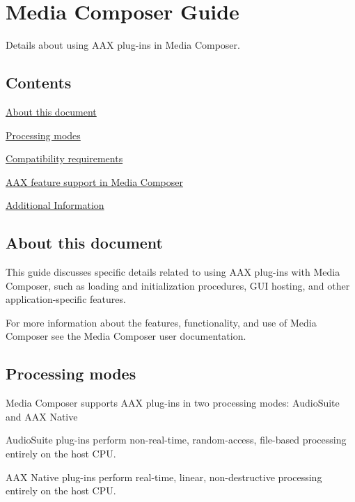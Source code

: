 \hypertarget{a00361}{}\section{Media Composer Guide}
\label{a00361}
Details about using A\+A\+X plug-\/ins in Media Composer. 

\hypertarget{a00361_aax_media_composer_guide_contents}{}\subsection{Contents}\label{a00361_aax_media_composer_guide_contents}
\begin{DoxyItemize}
\item \hyperlink{a00361_aax_media_composer_guide__about_this_document}{About this document} \item \hyperlink{a00361_aax_media_composer_guide__processing_modes}{Processing modes} \item \hyperlink{a00361_aax_media_composer_guide__requirements}{Compatibility requirements} \item \hyperlink{a00361_aax_media_composer_guide__features}{A\+A\+X feature support in Media Composer} \item \hyperlink{a00361_aax_media_composer_guide__additional_information}{Additional Information}\end{DoxyItemize}
 \hypertarget{a00361_aax_media_composer_guide__about_this_document}{}\subsection{About this document}\label{a00361_aax_media_composer_guide__about_this_document}
This guide discusses specific details related to using A\+A\+X plug-\/ins with Media Composer, such as loading and initialization procedures, G\+U\+I hosting, and other application-\/specific features.

For more information about the features, functionality, and use of Media Composer see the Media Composer user documentation. 

 \hypertarget{a00361_aax_media_composer_guide__processing_modes}{}\subsection{Processing modes}\label{a00361_aax_media_composer_guide__processing_modes}
Media Composer supports A\+A\+X plug-\/ins in two processing modes\+: Audio\+Suite and A\+A\+X Native 
\begin{DoxyItemize}
\item Audio\+Suite plug-\/ins perform non-\/real-\/time, random-\/access, file-\/based processing entirely on the host C\+P\+U.  
\item A\+A\+X Native plug-\/ins perform real-\/time, linear, non-\/destructive processing entirely on the host C\+P\+U. 
\end{DoxyItemize}

